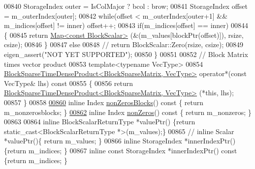 \begin{DoxyCode}
00840       StorageIndex outer = IsColMajor ? bcol : brow;
00841       StorageIndex offset = m\_outerIndex[outer];
00842       \textcolor{keywordflow}{while}(offset < m\_outerIndex[outer+1] && m\_indices[offset] != inner) offset++;
00843       \textcolor{keywordflow}{if}(m\_indices[offset] == inner)
00844       \{
00845         \textcolor{keywordflow}{return} \hyperlink{group___core___module_class_eigen_1_1_map}{Map<const BlockScalar>} (&(m\_values[blockPtr(offset)]), rsize, csize);
00846       \}
00847       \textcolor{keywordflow}{else}
00848 \textcolor{comment}{//        return BlockScalar::Zero(rsize, csize);}
00849         eigen\_assert(\textcolor{stringliteral}{"NOT YET SUPPORTED"});
00850     \}
00851 
00852     \textcolor{comment}{// Block Matrix times vector product}
00853     \textcolor{keyword}{template}<\textcolor{keyword}{typename} VecType>
00854     \hyperlink{class_eigen_1_1_block_sparse_time_dense_product}{BlockSparseTimeDenseProduct<BlockSparseMatrix, VecType>}
       operator*(\textcolor{keyword}{const} VecType& lhs)\textcolor{keyword}{ const}
00855 \textcolor{keyword}{    }\{
00856       \textcolor{keywordflow}{return} \hyperlink{class_eigen_1_1_block_sparse_time_dense_product}{BlockSparseTimeDenseProduct<BlockSparseMatrix, VecType>}
      (*\textcolor{keyword}{this}, lhs);
00857     \}
00858 
\hyperlink{group___sparse_core___module_a83d5af142c851196a2178bf9ec532d8c}{00860}     \textcolor{keyword}{inline} Index \hyperlink{group___sparse_core___module_a83d5af142c851196a2178bf9ec532d8c}{nonZerosBlocks}()\textcolor{keyword}{ const }\{ \textcolor{keywordflow}{return} m\_nonzerosblocks; \}
\hyperlink{group___sparse_core___module_a2c0d76392df6669fa66b592ef6b5618a}{00862}     \textcolor{keyword}{inline} Index \hyperlink{group___sparse_core___module_a2c0d76392df6669fa66b592ef6b5618a}{nonZeros}()\textcolor{keyword}{ const }\{ \textcolor{keywordflow}{return} m\_nonzeros; \}
00863 
00864     \textcolor{keyword}{inline} BlockScalarReturnType *valuePtr() \{\textcolor{keywordflow}{return} \textcolor{keyword}{static\_cast<}BlockScalarReturnType *\textcolor{keyword}{>}(m\_values);\}
00865 \textcolor{comment}{//    inline Scalar *valuePtr()\{ return m\_values; \}}
00866     \textcolor{keyword}{inline} StorageIndex *innerIndexPtr() \{\textcolor{keywordflow}{return} m\_indices; \}
00867     \textcolor{keyword}{inline} \textcolor{keyword}{const} StorageIndex *innerIndexPtr()\textcolor{keyword}{ const }\{\textcolor{keywordflow}{return} m\_indices; \}

\end{DoxyCode}

